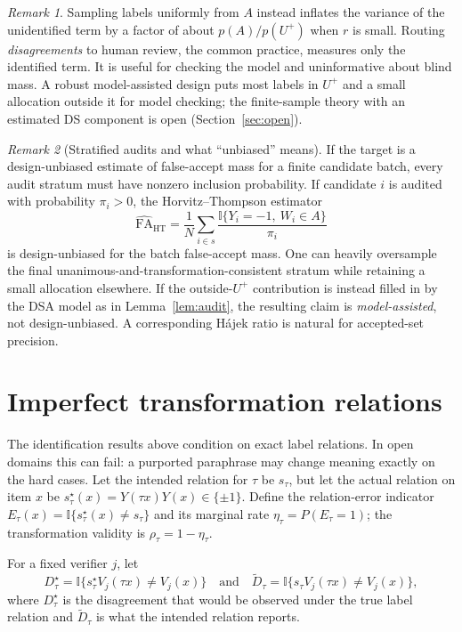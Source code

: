\documentclass[11pt]{article}
\theoremstyle{definition}
\theoremstyle{remark}
\newtheorem*{remark}{Remark}
\newcommand{\Up}{U^{+}}
\begin{document}
\begin{remark}
Sampling labels uniformly from $A$ instead inflates the variance of the unidentified term by a factor of about $p(A)/p(\Up)$ when $r$ is small. Routing \emph{disagreements} to human review, the common practice, measures only the identified term. It is useful for checking the model and uninformative about blind mass. A robust model-assisted design puts most labels in $\Up$ and a small allocation outside it for model checking; the finite-sample theory with an estimated DS component is open (Section~\ref{sec:open}).
\end{remark}

\begin{remark}[Stratified audits and what ``unbiased'' means]\label{rem:ht}
If the target is a design-unbiased estimate of false-accept mass for a finite candidate batch, every audit stratum must have nonzero inclusion probability. If candidate $i$ is audited with probability $\pi_i>0$, the Horvitz--Thompson estimator
\[
\widehat{\mathrm{FA}}_{\mathrm{HT}}=\frac{1}{N}\sum_{i\in s}\frac{\mathbb{I}\{Y_i=-1,\ W_i\in A\}}{\pi_i}
\]
is design-unbiased for the batch false-accept mass. One can heavily oversample the final unanimous-and-transformation-consistent stratum while retaining a small allocation elsewhere. If the outside-$\Up$ contribution is instead filled in by the DSA model as in Lemma~\ref{lem:audit}, the resulting claim is \emph{model-assisted}, not design-unbiased. A corresponding Hájek ratio is natural for accepted-set precision.
\end{remark}

\section{Imperfect transformation relations}\label{sec:rho}

The identification results above condition on exact label relations. In open domains this can fail: a purported paraphrase may change meaning exactly on the hard cases. Let the intended relation for $\tau$ be $s_\tau$, but let the actual relation on item $x$ be
$s_\tau^\star(x)=Y(\tau x)Y(x)\in\{\pm1\}$. Define the relation-error indicator
$E_\tau(x)=\mathbb{I}\{s_\tau^\star(x)\neq s_\tau\}$ and its marginal rate $\eta_\tau=P(E_\tau=1)$; the transformation validity is $\rho_\tau=1-\eta_\tau$.

For a fixed verifier $j$, let
\[
D_\tau^\star=\mathbb{I}\{s_\tau^\star V_j(\tau x)\neq V_j(x)\}
\quad\text{and}\quad
\widetilde D_\tau=\mathbb{I}\{s_\tau V_j(\tau x)\neq V_j(x)\},
\]
where $D_\tau^\star$ is the disagreement that would be observed under the true label relation and $\widetilde D_\tau$ is what the intended relation reports.
\end{document}
